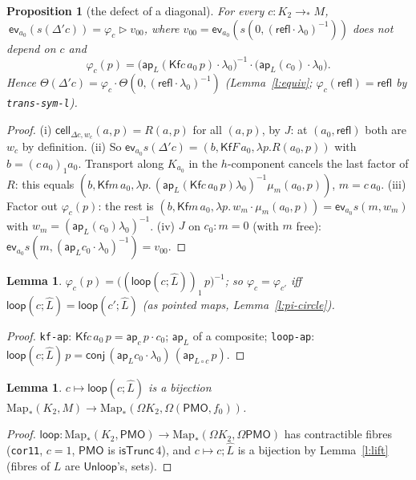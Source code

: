 \documentclass[11pt]{amsart}
\newtheorem{proposition}[theorem]{Proposition}
\newtheorem{lemma}[theorem]{Lemma}
\theoremstyle{definition}
\theoremstyle{remark}
\newcommand{\Om}{\Omega}
\newcommand{\Map}{\mathrm{Map}_*}
\newcommand{\code}[1]{\texttt{#1}}
\newcommand{\cT}{\mathsf{isTrunc}}
\newcommand{\refl}{\mathsf{refl}}
\newcommand{\lp}{\mathsf{loop}}
\newcommand{\Kf}{\mathsf{Kf}}
\newcommand{\Unl}{\mathsf{Unloop}}
\newcommand{\PMO}{\mathsf{PMO}}
\begin{document}
\begin{proposition}[the defect of a diagonal]\label{p:star}
For every $c:K_2\to_*M$,
$\ \mathsf{ev}_{a_0}(s(\Delta'c))=\varphi_c\rhd v_{00}$, where
$v_{00}=\mathsf{ev}_{a_0}(s(0,(\refl\cdot\lambda_0)^{-1}))$ does not depend on $c$ and
\[\varphi_c(p)=\bigl(\mathsf{ap}_L(\Kf c\,a_0\,p)\cdot\lambda_0\bigr)^{-1}\cdot\bigl(\mathsf{ap}_L(c_0)\cdot\lambda_0\bigr).\]
Hence $\Theta(\Delta'c)=\varphi_c\cdot\Theta(0,(\refl\cdot\lambda_0)^{-1})$
(Lemma~\ref{l:equiv}; $\varphi_c(\refl)=\refl$ by \code{trans-sym-l}).
\end{proposition}
\begin{proof}
(i) $\mathsf{cell}_{\Delta c,w_c}(a,p)=R(a,p)$ for all $(a,p)$, by $J$: at
$(a_0,\refl)$ both are $w_c$ by definition. (ii) So
$\mathsf{ev}_{a_0}s(\Delta' c)=(b,\Kf F\,a_0,\lambda p.R(a_0,p))$ with
$b=(c\,a_0)_1a_0$. Transport along $K_{a_0}$ in the $h$-component
cancels the last factor of $R$: this equals
$(b,\Kf m\,a_0,\lambda p.\,(\mathsf{ap}_L(\Kf c\,a_0\,p)\lambda_0)^{-1}\mu_m(a_0,p))$,
$m=c\,a_0$. (iii) Factor out $\varphi_c(p)$: the rest is
$(b,\Kf m\,a_0,\lambda p.\,w_m\cdot\mu_m(a_0,p))=\mathsf{ev}_{a_0}s(m,w_m)$
with $w_m=(\mathsf{ap}_L(c_0)\lambda_0)^{-1}$. (iv) $J$ on
$c_0:m=0$ (with $m$ free): $\mathsf{ev}_{a_0}s(m,(\mathsf{ap}_L c_0\cdot\lambda_0)^{-1})=v_{00}$.
\end{proof}

\begin{lemma}\label{l:phi}
$\varphi_c(p)=\bigl((\lp(c;\hat L))_1\,p\bigr)^{-1}$; so $\varphi_c=\varphi_{c'}$ iff
$\lp(c;\hat L)=\lp(c';\hat L)$ (as pointed maps, Lemma~\ref{l:pi-circle}).
\end{lemma}
\begin{proof}
\code{kf-ap}: $\Kf c\,a_0\,p=\mathsf{ap}_c\,p\cdot c_0$; $\mathsf{ap}_L$ of a
composite; \code{loop-ap}: $\lp(c;\hat L)\,p=\mathsf{conj}\,(\mathsf{ap}_Lc_0\cdot\lambda_0)\,(\mathsf{ap}_{L\circ c}\,p)$.
\end{proof}

\begin{lemma}\label{l:bij-loop}
$c\mapsto\lp(c;\hat L)$ is a bijection $\Map(K_2,M)\to\Map(\Om K_2,\Om(\PMO,f_0))$.
\end{lemma}
\begin{proof}
$\lp:\Map(K_2,\PMO)\to\Map(\Om K_2,\Om\PMO)$ has contractible fibres
(\code{cor11}, $c=1$, $\PMO$ is $\cT\,4$), and $c\mapsto c;\hat L$ is a
bijection by Lemma~\ref{l:lift} (fibres of $L$ are $\Unl$'s, sets).
\end{proof}
\end{document}
